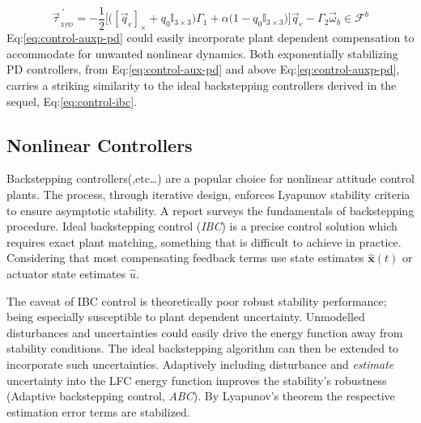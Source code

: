 \begin{equation}\label{eq:control-auxp-pd}
\vec{\tau}^{\hspace{3pt}'}_{_{XPD}}=-\frac{1}{2}\Big[\big([\vec{q}_e]_\times+q_0\mathbb{I}_{3\times 3}\big)\Gamma_1+\alpha\big(1-q_0\mathbb{I}_{3\times 3}\big)\Big]\vec{q}_e-\Gamma_2\vec{\omega}_b\in\mathcal{F}^b
\end{equation} 
Eq:\ref{eq:control-auxp-pd} could easily incorporate plant dependent compensation to accommodate for unwanted nonlinear dynamics. Both exponentially stabilizing PD controllers, from Eq:\ref{eq:control-aux-pd} and above Eq:\ref{eq:control-auxp-pd}, carries a striking similarity to the ideal backstepping controllers derived in the sequel, Eq:\ref{eq:control-ibc}. 
\subsection{Nonlinear Controllers}
\label{subsec:control.attitude.nonlinear}
Backstepping controllers(\cite{satellitebackstepping,intelligentbackstep,backstepslidingmode},etc\ldots) are a popular choice for nonlinear attitude control plants. The process, through iterative design, enforces Lyapunov stability criteria to ensure asymptotic stability. A report \cite{backstepping} surveys the fundamentals of backstepping procedure. Ideal backstepping control (\emph{IBC}) is a precise control solution which requires exact plant matching, something that is difficult to achieve in practice. Considering that most compensating feedback terms use state estimates $\hat{\mathbf{x}}(t)$ or actuator state estimates $\hat{u}$. 
\par
The caveat of IBC control is theoretically poor robust stability performance; being especially susceptible to plant dependent uncertainty. Unmodelled disturbances and uncertainties could easily drive the energy function away from stability conditions. The ideal backstepping algorithm can then be extended to incorporate such uncertainties. Adaptively including disturbance and \emph{estimate} uncertainty into the LFC energy function improves the stability's robustness (Adaptive backstepping control, \emph{ABC}). By Lyapunov's theorem the respective estimation error terms are stabilized.
